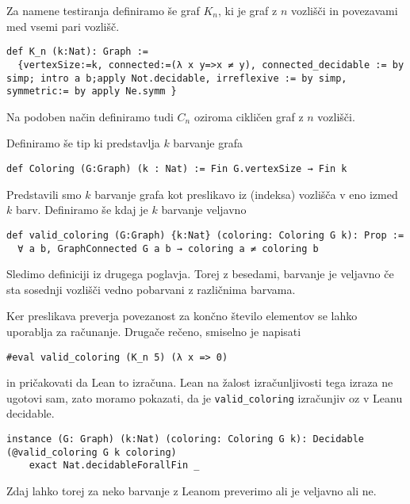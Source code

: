 \documentclass[mat1]{fmfdelo}
\begin{document}
Za namene testiranja definiramo še graf $K_n$, ki je graf z $n$ vozlišči in povezavami med vsemi pari vozlišč.
\begin{lstlisting}
def K_n (k:Nat): Graph :=
  {vertexSize:=k, connected:=(λ x y=>x ≠ y), connected_decidable := by simp; intro a b;apply Not.decidable, irreflexive := by simp, symmetric:= by apply Ne.symm }
\end{lstlisting}
Na podoben način definiramo tudi $C_n$ oziroma cikličen graf z $n$ vozlišči.

Definiramo še tip ki predstavlja $k$ barvanje grafa
\begin{lstlisting}
def Coloring (G:Graph) (k : Nat) := Fin G.vertexSize → Fin k
\end{lstlisting}

Predstavili smo $k$ barvanje grafa kot preslikavo iz (indeksa) vozlišča v eno izmed $k$ barv.
Definiramo še kdaj je $k$ barvanje veljavno
\begin{lstlisting}
def valid_coloring (G:Graph) {k:Nat} (coloring: Coloring G k): Prop :=
  ∀ a b, GraphConnected G a b → coloring a ≠ coloring b
\end{lstlisting}
Sledimo definiciji iz drugega poglavja. Torej z besedami, barvanje je veljavno 
če sta sosednji vozlišči vedno pobarvani z različnima barvama.

Ker preslikava preverja povezanost za končno število elementov se lahko uporablja za računanje. Drugače rečeno, smiselno
je napisati
\begin{lstlisting}
#eval valid_coloring (K_n 5) (λ x => 0)
\end{lstlisting}
in pričakovati da Lean to izračuna. Lean na žalost izračunljivosti tega izraza ne ugotovi sam, zato moramo pokazati, 
da je \lstinline{valid_coloring} izračunjiv oz v Leanu decidable.
\begin{lstlisting}
instance (G: Graph) (k:Nat) (coloring: Coloring G k): Decidable (@valid_coloring G k coloring)
    exact Nat.decidableForallFin _
\end{lstlisting}

Zdaj lahko torej za neko barvanje z Leanom preverimo ali je veljavno ali ne. 
\end{document}
